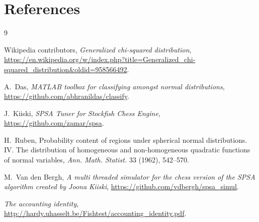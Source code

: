 \documentclass[11pt]{article}
\theoremstyle{plain}
\theoremstyle{definition}
\theoremstyle{remark}
\begin{document}
\section*{References}

\begin{thebibliography}{9}

Wikipedia contributors, \emph{Generalized chi-squared distribution},
\url{https://en.wikipedia.org/w/index.php?title=Generalized_chi-squared_distribution&oldid=958566492}.

A.~Das,
\emph{MATLAB toolbox for classifying amongst normal distributions},
\url{https://github.com/abhranildas/classify}.

J.~Kiiski,
\emph{SPSA Tuner for Stockfish Chess Engine},
\url{https://github.com/zamar/spsa}.

H.~Ruben,
Probability content of regions under spherical normal distributions. IV. The distribution of homogeneous and non-homogeneous quadratic functions of normal variables,
\emph{Ann. Math. Statist.} 33 (1962), 542--570.

M.~Van den Bergh,
\emph{A multi threaded simulator for the chess version of the SPSA algorithm created by Joona Kiiski},
\url{https://github.com/vdbergh/spsa_simul}.

\emph{The accounting identity},
\url{http://hardy.uhasselt.be/Fishtest/accounting_identity.pdf}.

\end{thebibliography}
\end{document}
